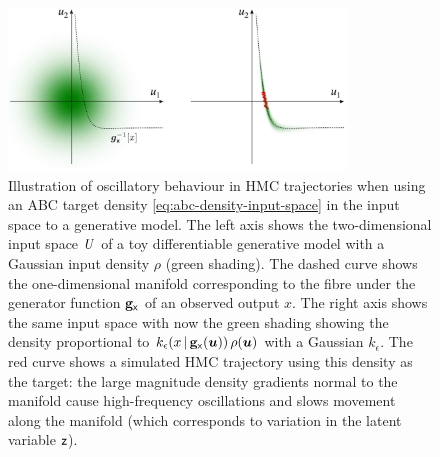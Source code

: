 \begin{figure}[!t]
\centering
\includegraphics[width=0.8\textwidth]{images/gaussian-abc-with-hmc-trajectory-gray}
\caption[Oscillatory Hamiltonian trajectory example.]{Illustration of oscillatory behaviour in \ac{HMC} trajectories when using an \ac{ABC} target density \eqref{eq:abc-density-input-space} in the input space to a generative model. The left axis shows the two-dimensional input space $\mathit{U}$ of a toy differentiable generative model with a Gaussian input density $\rho$ (green shading). The dashed curve shows the one-dimensional manifold corresponding to the fibre under the generator function ${\mathbf{g}}_{\mathsf{x}}$ of an observed output $x$. The right axis shows the same input space with now the green shading showing the density proportional to $k_\epsilon\lpa x\gvn \genfunc_{\rvar{x}}(\vct{u})\rpa \,\rho(\vct{u})$ with a Gaussian $k_\epsilon$. The red curve shows a simulated \ac{HMC} trajectory using this density as the target: the large magnitude density gradients normal to the manifold cause high-frequency oscillations and slows movement along the manifold (which corresponds to variation in the latent variable $\mathsf{z}$).}
\label{fig:gaussian-abc-hmc-trajectory-example}
\end{figure} 


